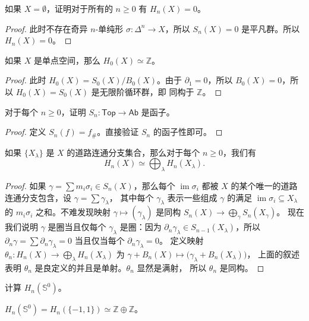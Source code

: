 \documentclass[fontset=none]{Notes}
\DeclareMathOperator\im{im}
\newcommand{\cat}[1]{\mathsf{#1}}
\begin{document}
\begin{problem}{}{}
  如果 $X=\emptyset$，证明对于所有的 $n\geq 0$ 有 $H_n(X)=0$。
\end{problem}
\begin{proof}
  此时不存在奇异 $n$-单纯形 $\sigma:\Delta^n\to X$，所以
  $S_n(X)=0$ 是平凡群。所以 $H_n(X)=0$。
\end{proof}

\begin{problem}{}{}
  如果 $X$ 是单点空间，那么 $H_0(X)\simeq \mathbb{Z}$。
\end{problem}
\begin{proof}
  此时 $H_0(X)=S_0(X)/B_0(X)$。由于 $\partial_1=0$，所以
  $B_0(X)=0$，所以 $H_0(X)=S_0(X)$ 是无限阶循环群，即
  同构于 $\mathbb{Z}$。
\end{proof}

\begin{problem}{}{}
  对于每个 $n\geq 0$，证明 $S_n:\cat{Top}\to \cat{Ab}$ 是函子。
\end{problem}
\begin{proof}
  定义 $S_n(f)=f_\#$。直接验证 $S_n$ 的函子性即可。
\end{proof}

\begin{theorem}\label{thm:H0 of component}
  如果 $\{X_\lambda\}$ 是 $X$ 的道路连通分支集合，那么对于每个
  $n\geq 0$，我们有
  \[
    H_n(X)\simeq \bigoplus_\lambda H_n(X_\lambda).
  \]
\end{theorem}
\begin{proof}
  如果 $\gamma=\sum m_i\sigma_i\in S_n(X)$，那么每个 $\im\sigma_i$
  都被 $X$ 的某个唯一的道路连通分支包含，设 $\gamma=\sum \gamma_\lambda$，
  其中每个 $\gamma_\lambda$ 表示一些组成 $\gamma$ 的满足 $\im\sigma_i\subseteq X_\lambda$ 
  的 $m_i\sigma_i$ 之和。不难发现映射 $\gamma\mapsto (\gamma_\lambda)$
  是同构 $S_n(X)\to \bigoplus_\gamma S_n(X_\gamma)$。
  现在我们说明 $\gamma$ 是圈当且仅每个 $\gamma_\lambda$ 是圈：因为
  $\partial_n\gamma_\lambda\in S_{n-1}(X_\lambda)$，所以 $\partial_n\gamma=\sum\partial_n\gamma_\lambda=0$
  当且仅当每个 $\partial_n\gamma_\lambda=0$。
  定义映射 $\theta_n:H_n(X)\to \bigoplus_\lambda H_n(X_\lambda)$ 为
  $\gamma+B_n(X)\mapsto \bigl(\gamma_\lambda+B_n(X_\lambda)\bigr)$，
  上面的叙述表明 $\theta_n$ 是良定义的并且是单射。$\theta_n$ 显然是满射，
  所以 $\theta_n$ 是同构。
\end{proof}

\begin{problem}{}{}
  计算 $H_n(\mathbb{S}^0)$。
\end{problem}
\begin{solution}
  $H_n(\mathbb{S}^0)=H_n(\{-1,1\})\simeq \mathbb{Z}\oplus \mathbb{Z}$。
\end{solution}
\end{document}

